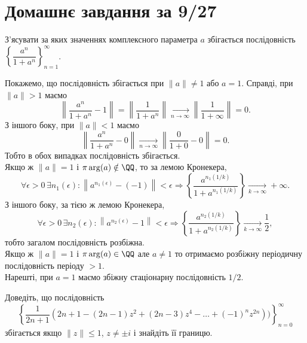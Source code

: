 \setcounter{section}{4}

\section{Домашнє завдання за 9/27}

\begin{problem}[Евграфов, 2.9.4]
    З'ясувати за яких значеннях комплексного параметра $a$ збігається послідовність $\left\{\dfrac{a^n}{1+a^n}\right\}_{n=1}^\infty$.
\end{problem}

\begin{solution}
    Покажемо, що послідовність збігається при $\|a\|\ne1$ або $a = 1$. Справді, при $\|a\|>1$ маємо 
    \[ \left\| \dfrac {a ^ n} {1 + a^n} - 1 \right\| = \left\| \dfrac {1} {1+a^n} \right\| \underset{n \to \infty}{\to} \left\| \dfrac {1} {1 + \infty} \right\| = 0. \]
    З іншого боку, при $\|a\|<1$ маємо 
    \[ \left\| \dfrac {a ^ n} {1 + a ^ n} - 0 \right\| \xrightarrow[n \to \infty]{} \left\| \dfrac {0} {1 + 0} - 0 \right\| = 0. \]
    Тобто в обох випадках послідовність збігається. \\
    
    Якщо ж $\|a\|=1$ і $\pi\arg(a)\notin\QQ$, то за лемою Кронекера, 
    \[ \forall \epsilon > 0 \, \exists n_1(\epsilon): \left\|a^{n_1(\epsilon)} - (-1)\right\| < \epsilon \Rightarrow \left\{\dfrac{a^{n_1(1 / k)}}{1 + a^{n_1(1 / k)}}\right\} \xrightarrow[k \to \infty]{} +\infty.\]
    З іншого боку, за тією ж лемою Кронекера, 
    \[ \forall \epsilon > 0 \, \exists n_2(\epsilon): \left\|a^{n_2(\epsilon)} - 1\right\| < \epsilon \Rightarrow \left\{\dfrac{a^{n_2(1 / k)}}{1 + a^{n_2(1 / k)}}\right\} \xrightarrow[k \to \infty]{} \dfrac12,\]
    тобто загалом послідовність розбіжна. \\
    
    Якщо ж $\|a\|=1$ і $\pi\arg(a)\in\QQ$ але $a\ne1$ то отримаємо розбіжну періодичну послідовність періоду $> 1$. \\
    
    Нарешті, при $a = 1$ маємо збіжну стаціонарну послідовність $1 / 2$.
\end{solution}

\begin{problem}[Евграфов, 2.14.2]
    Доведіть, що послідовність \[\left\{\dfrac{1}{2n+1}(2n + 1-(2n-1)z^2 + (2n-3)z^4 - \ldots + (-1)^n z^{2n}))\right\}_{n=0}^\infty\] збігається якщо $\|z\|\leq 1$, $z\ne\pm i$ і знайдіть її границю.
\end{problem}

